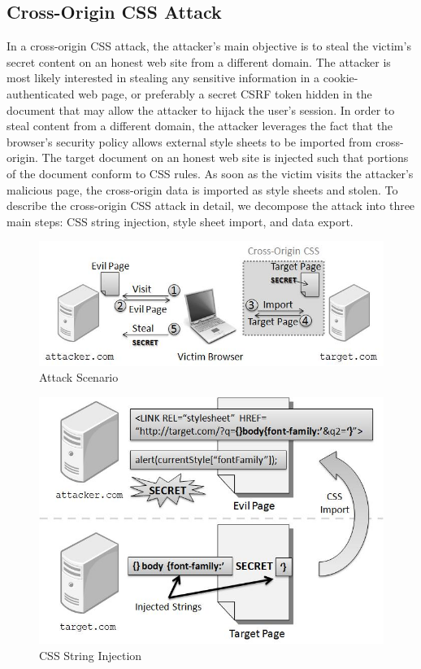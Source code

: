 \documentclass{acm_proc_article-sp}
\begin{document}
{\subsection{Cross-Origin CSS Attack}
In a cross-origin CSS attack, the attacker's main objective is to steal the victim's secret content on an honest web site from a different domain. The attacker is most likely interested in stealing any sensitive information in a cookie-authenticated web page, or preferably a secret CSRF token\cite{csrf} hidden in the document that may allow the attacker to hijack the user's session. In order to steal content from a different domain, the attacker leverages the fact that the browser's security policy allows external style sheets to be imported from cross-origin. The target document on an honest web site is injected such that portions of the document conform to CSS rules. As soon as the victim visits the attacker's malicious page, the cross-origin data is imported as style sheets and stolen. To describe the cross-origin CSS attack in detail, we decompose the attack into three main steps: CSS string injection, style sheet import, and data export.

\begin{figure}
\centering
\includegraphics[width=\linewidth]{scenario.jpg}
\caption{Attack Scenario}
\end{figure}

\begin{figure}
\centering
\includegraphics[width=\linewidth]{injection.jpg}
\caption{CSS String Injection}
\end{figure}

}
\end{document}
